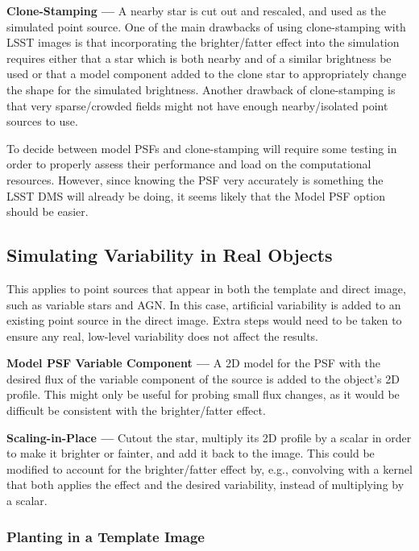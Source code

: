 \documentclass[DM,lsstdraft,toc]{lsstdoc}
\begin{document}
{\bf Clone-Stamping ---} A nearby star is cut out and rescaled, and used as the simulated point source. One of the main drawbacks of using clone-stamping with LSST images is that incorporating the brighter/fatter effect into the simulation requires either that a star which is both nearby and of a similar brightness be used or that a model component added to the clone star to appropriately change the shape for the simulated brightness. Another drawback of clone-stamping is that very sparse/crowded fields might not have enough nearby/isolated point sources to use.

To decide between model PSFs and clone-stamping will require some testing in order to properly assess their performance and load on the computational resources. However, since knowing the PSF very accurately is something the LSST DMS will already be doing, it seems likely that the Model PSF option should be easier.

\subsection{Simulating Variability in Real Objects}\label{ssec:tech_pre}

This applies to point sources that appear in both the template and direct image, such as variable stars and AGN. In this case, artificial variability is added to an existing point source in the direct image. Extra steps would need to be taken to ensure any real, low-level variability does not affect the results.

{\bf Model PSF Variable Component ---} A 2D model for the PSF with the desired flux of the variable component of the source is added to the object's 2D profile. This might only be useful for probing small flux changes, as it would be difficult be consistent with the brighter/fatter effect.

{\bf Scaling-in-Place ---} Cutout the star, multiply its 2D profile by a scalar in order to make it brighter or fainter, and add it back to the image. This could be modified to account for the brighter/fatter effect by, e.g., convolving with a kernel that both applies the effect and the desired variability, instead of multiplying by a scalar.

\subsubsection{Planting in a Template Image}\label{ssec:tech_pre_temp}
\end{document}
